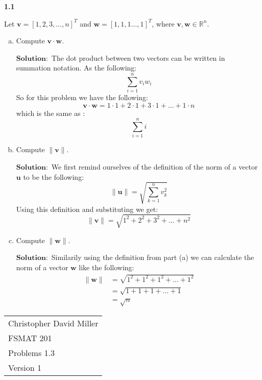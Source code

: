 \documentclass[12pt]{article}
\begin{document}
    
    \textbf{1.1} \\  %
    \begin{prop}
        Let $\mathbf{v} = [1,2,3,\dots ,n]^T$ and $\mathbf{w} = [1,1,1\dots,1]^T$, where $\mathbf{v},\mathbf{w} \in \mathbb{R}^n$.
    \end{prop}
    
    \begin{enumerate}[(a)]
        \item Compute $\mathbf{v} \cdot \mathbf{w}$.
        
            $\textbf{Solution}:$ The dot product between two vectors can be written in summation notation. As the following:\[
              \sum_{i=1}^n v_iw_i  
            \]
            So for this problem we have the following:
            \[
            \mathbf{v} \cdot \mathbf{w} = 1\cdot1 + 2 \cdot 1 + 3 \cdot 1 + \dots + 1 \cdot n
            \]
            which is the same as :
            \[
            \sum_{i=1}^n i
            \]
        \item Compute $\|\mathbf{v}\|$.        
        
            $\textbf{Solution}:$ We first remind ourselves of the definition of the norm of a vector $\mathbf{u}$ to be  the following:\[
                \|  \mathbf{u} \| = \sqrt{\sum_{k=1}^{n}v_k^2}
            \]
            Using this definition and substituting we get:\[
                \|  \mathbf{v} \| = \sqrt{1^2 + 2^2 + 3^2 + \dots +n^2}
            \]
        \item Compute $\|\mathbf{w}\|$.
                
        $\textbf{Solution}:$ Similarily using the definition from part (a) we can calculate the norm of a vector $\mathbf{w}$ like the following:
        \begin{align*}
            \|  \mathbf{w} \|& = \sqrt{1^2 + 1^2 + 1^2 + \dots +1^2}\\
            & = \sqrt{1 + 1 + 1 + \dots +1}\\
            & = \sqrt{n}
        \end{align*}
       
    \end{enumerate}

\newpage
\begin{flushright}
    \begin{tabular}{l}
    Christopher David Miller \\  %
    FSMAT 201 \\  %
    Problems 1.3 \\  %
    Version 1 \\ %
    \end{tabular}
    \end{flushright}
    \vspace{20pt}  %
    
\end{document}
